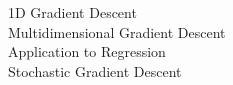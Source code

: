 \documentclass[preview]{standalone}
\begin{document}
1D Gradient Descent\\Multidimensional Gradient Descent\\Application to Regression\\Stochastic Gradient Descent\\
\end{document}
